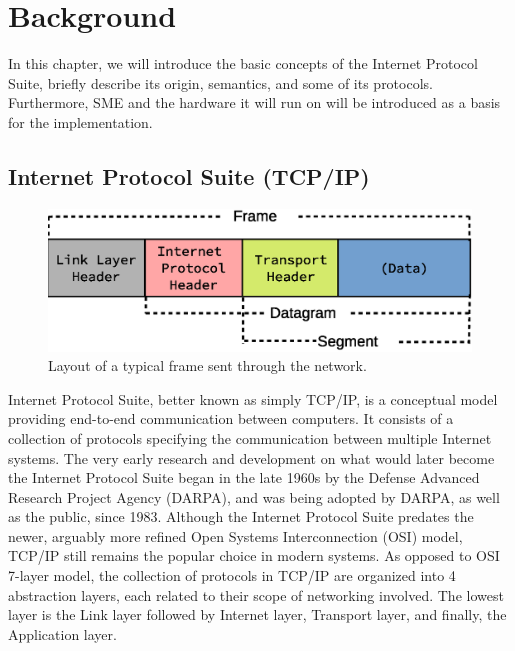 \chapter{Background}

In this chapter, we will introduce the basic concepts of the Internet Protocol
Suite, briefly describe its origin, semantics, and some of its protocols.
Furthermore, SME and the hardware it will run on will be introduced as a basis
for the implementation.


\section{Internet Protocol Suite (TCP/IP)}
\begin{figure}
\centering
\includegraphics[width=\linewidth]{background/frame.eps}
\caption{Layout of a typical frame sent through the network.}
\label{fig:frame_layout}
\end{figure}


Internet Protocol Suite, better known as simply TCP/IP, is a conceptual
model providing end-to-end communication between computers. It consists of
a collection of protocols specifying the communication between multiple
Internet systems\cite{RFC1122}.  The very early research and development
on what would later become the Internet Protocol Suite began in the late 1960s
by the Defense Advanced Research Project Agency (DARPA), and was being
adopted by DARPA, as well as the public, since 1983\cite{DARPA_internet}.
Although the Internet Protocol Suite predates the newer, arguably more
refined Open Systems Interconnection (OSI) model, TCP/IP still
remains the popular choice in modern systems.  As opposed to OSI 7-layer
model\cite{X.200}, the collection of protocols in TCP/IP are organized
into 4 abstraction layers, each related to their scope of networking
involved. The lowest layer is the Link layer followed by Internet layer, Transport layer, and
finally, the Application layer.

